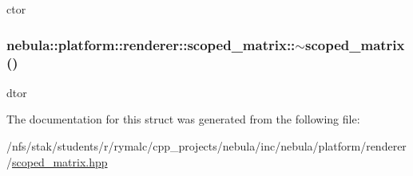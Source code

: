 ctor \hypertarget{structnebula_1_1platform_1_1renderer_1_1scoped__matrix_aea3c017adec05d7c3955c2ff79d06d87}{
\subsubsection[{$\sim$scoped\_\-matrix}]{\setlength{\rightskip}{0pt plus 5cm}nebula::platform::renderer::scoped\_\-matrix::$\sim$scoped\_\-matrix ()}}
\label{structnebula_1_1platform_1_1renderer_1_1scoped__matrix_aea3c017adec05d7c3955c2ff79d06d87}


dtor 

The documentation for this struct was generated from the following file:\begin{DoxyCompactItemize}
\item 
/nfs/stak/students/r/rymalc/cpp\_\-projects/nebula/inc/nebula/platform/renderer/\hyperlink{inc_2nebula_2platform_2renderer_2scoped__matrix_8hpp}{scoped\_\-matrix.hpp}\end{DoxyCompactItemize}
